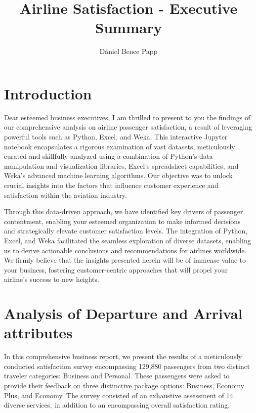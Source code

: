 \documentclass[11pt]{article}
\title{Airline Satisfaction - Executive Summary}
\author{
        Dániel Bence Papp
    }
\begin{document}
    
    \maketitle
    
    \clearpage
    \tableofcontents
    \clearpage

    \hypertarget{introduction}{%
\section{Introduction}\label{introduction}}


Dear esteemed business executives, I am thrilled to present to you the findings of our comprehensive analysis on airline passenger satisfaction, a result of leveraging powerful tools such as Python, Excel, and Weka. This interactive Jupyter notebook\cite{authors-gh} encapsulates a rigorous examination of vast datasets, meticulously curated and skillfully analyzed using a combination of Python's data manipulation and visualization libraries, Excel's spreadsheet capabilities, and Weka's advanced machine learning algorithms. Our objective was to unlock crucial insights into the factors that influence customer experience and satisfaction within the aviation industry.

Through this data-driven approach, we have identified key drivers of passenger contentment, enabling your esteemed organization to make informed decisions and strategically elevate customer satisfaction levels. The integration of Python, Excel, and Weka facilitated the seamless exploration of diverse datasets, enabling us to derive actionable conclusions and recommendations for airlines worldwide. We firmly believe that the insights presented herein will be of immense value to your business, fostering customer-centric approaches that will propel your airline's success to new heights.

    \hypertarget{question-1}{%
\section{Analysis of Departure and Arrival attributes}\label{question-1}}

In this comprehensive business report, we present the results of a meticulously conducted satisfaction survey encompassing 129,880 passengers from two distinct traveler categories: Business and Personal. These passengers were asked to provide their feedback on three distinctive package options: Business, Economy Plus, and Economy. The survey consisted of an exhaustive assessment of 14 diverse services, in addition to an encompassing overall satisfaction rating.
\end{document}
